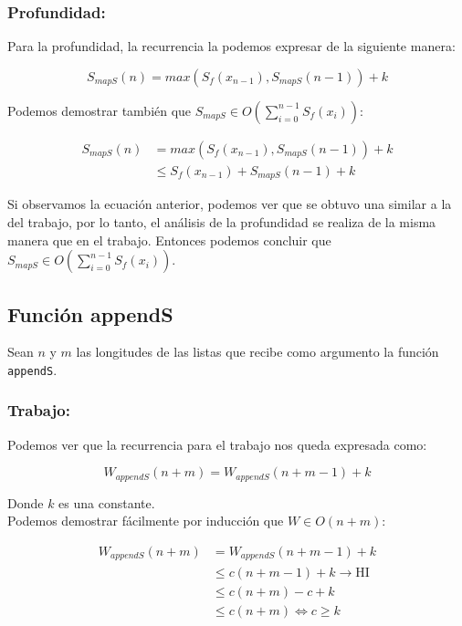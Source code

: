 \documentclass[11pt]{article}
\begin{document}
\subsubsection{Profundidad:}

Para la profundidad, la recurrencia la podemos expresar de la siguiente manera:

\begin{equation*}
    S_{mapS}(n) = max(S_f(x_{n- 1}), S_{mapS}(n - 1)) + k
\end{equation*}

Podemos demostrar también que $ S_{mapS} \in O\left(\displaystyle\sum_{i=0}^{n - 1}S_f(x_i)\right) $:

\begin{align*}
    S_{mapS}(n) & = max(S_f(x_{n- 1}), S_{mapS}(n - 1)) + k \\
               & \leq S_f(x_{n- 1}) + S_{mapS}(n - 1) + k
\end{align*}

Si observamos la ecuación anterior, podemos ver que se obtuvo una similar
a la del trabajo, por lo tanto, el análisis de la profundidad se realiza
de la misma manera que en el trabajo. Entonces podemos concluir que 
$ S_{mapS} \in O\left(\displaystyle\sum_{i=0}^{n - 1}S_f(x_i)\right) $.


\subsection{Función appendS}

Sean $n$ y $m$ las longitudes de las listas que recibe como argumento
la función \texttt{appendS}. 
\subsubsection{Trabajo:}
Podemos ver que la recurrencia para el trabajo nos queda expresada como:

\begin{equation*}
    W_{appendS}(n + m) = W_{appendS}(n + m - 1) + k
\end{equation*}

Donde $k$ es una constante. \\

Podemos demostrar fácilmente por inducción que $W \in O(n+m)$:

\begin{align*}
    W_{appendS}(n + m) & = W_{appendS}(n + m - 1) + k \\
             & \leq c(n + m - 1) + k \rightarrow \text{HI}\\
             & \leq c(n + m) - c + k \\
             & \leq c(n + m) \iff c \geq k
\end{align*}
\end{document}

